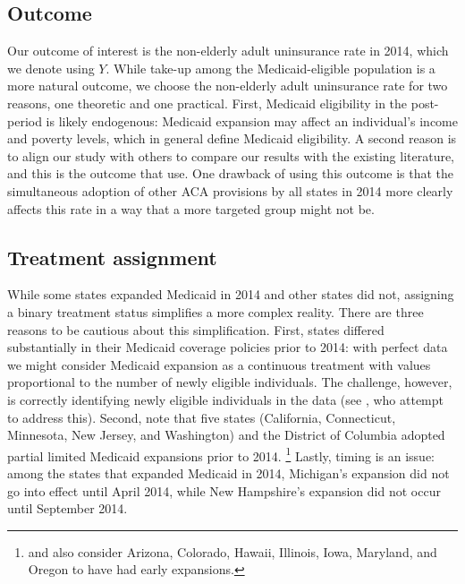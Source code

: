 \documentclass[article]{imsart}
\theoremstyle{plain}
\theoremstyle{remark}
\begin{document}
\subsection{Outcome}

Our outcome of interest is the non-elderly adult uninsurance rate in 2014, which we denote using $Y$. While take-up among the Medicaid-eligible population is a more natural outcome, we choose the non-elderly adult uninsurance rate for two reasons, one theoretic and one practical. First, Medicaid eligibility in the post-period is likely endogenous: Medicaid expansion may affect an individual's income and poverty levels, which in general define Medicaid eligibility. A second reason is to align our study with others to compare our results with the existing literature, and this is the outcome that \cite{courtemanche2017early} use. One drawback of using this outcome is that the simultaneous adoption of other ACA provisions by all states in 2014 more clearly affects this rate in a way that a more targeted group might not be.

\subsection{Treatment assignment} \label{sssec:txassign}

While some states expanded Medicaid in 2014 and other states did not, assigning a binary treatment status simplifies a more complex reality. There are three reasons to be cautious about this simplification. First, states differed substantially in their Medicaid coverage policies prior to 2014: with perfect data we might consider Medicaid expansion as a continuous treatment with values proportional to the number of newly eligible individuals. The challenge, however, is correctly identifying newly eligible individuals in the data (see \cite{frean2017premium}, who attempt to address this). Second, \cite{frean2017premium} note that five states (California, Connecticut, Minnesota, New Jersey, and Washington) and the District of Columbia adopted partial limited Medicaid expansions prior to 2014. \footnote{\cite{kaestner2017effects} and \cite{courtemanche2017early} also consider Arizona, Colorado, Hawaii, Illinois, Iowa, Maryland, and Oregon to have had early expansions.} Lastly, timing is an issue: among the states that expanded Medicaid in 2014, Michigan's expansion did not go into effect until April 2014, while New Hampshire's expansion did not occur until September 2014.
\end{document}
